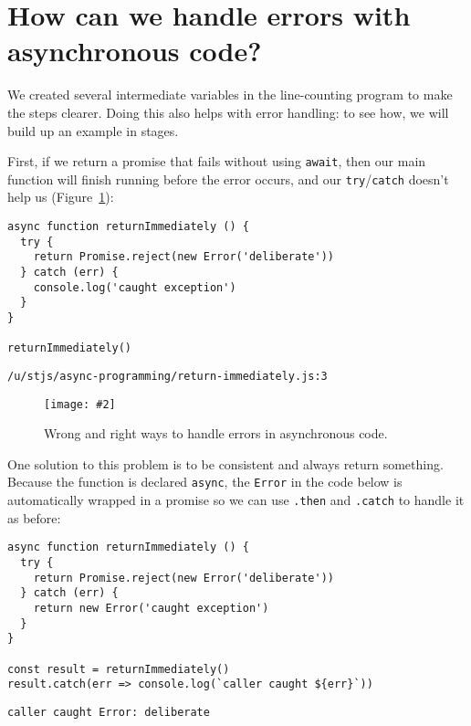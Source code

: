 \documentclass[krantzl]{krantz}
\newcommand{\figpdf}[4]{\begin{figure}%
\centering%
\texttt{[image: \#2]}%
\caption{#3}%
\label{#1}%
\end{figure}}
\newcommand{\figref}[1]{Figure~\ref{#1}}
\begin{document}
\section{How can we handle errors with asynchronous code?}\label{async-programming-errors}


We created several intermediate variables in the line-counting program to make the steps clearer.
Doing this also helps with error handling:
to see how,
we will build up an example in stages.


First,
if we return a promise that fails without using \texttt{await},
then our main function will finish running before the error occurs,
and our \texttt{try}/\texttt{catch} doesn’t help us
(\figref{async-programming-handling-errors}):


\begin{lstlisting}[frame=tblr]
async function returnImmediately () {
  try {
    return Promise.reject(new Error('deliberate'))
  } catch (err) {
    console.log('caught exception')
  }
}

returnImmediately()
\end{lstlisting}



\begin{lstlisting}[frame=tblr,backgroundcolor=\color{black!5}]
/u/stjs/async-programming/return-immediately.js:3
\end{lstlisting}


\figpdf{async-programming-handling-errors}{./async-programming/handling-errors.pdf}{Wrong and right ways to handle errors in asynchronous code.}{0.6}


One solution to this problem is to be consistent and always return something.
Because the function is declared \texttt{async},
the \texttt{Error} in the code below is automatically wrapped in a promise
so we can use \texttt{.then} and \texttt{.catch} to handle it as before:


\begin{lstlisting}[frame=tblr]
async function returnImmediately () {
  try {
    return Promise.reject(new Error('deliberate'))
  } catch (err) {
    return new Error('caught exception')
  }
}

const result = returnImmediately()
result.catch(err => console.log(`caller caught ${err}`))
\end{lstlisting}



\begin{lstlisting}[frame=tblr,backgroundcolor=\color{black!5}]
caller caught Error: deliberate
\end{lstlisting}
\end{document}
